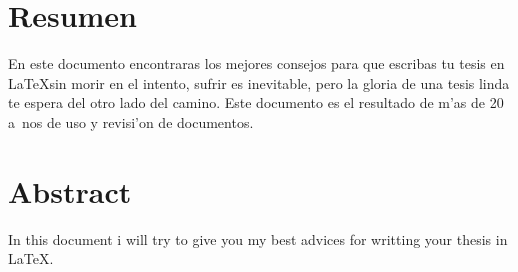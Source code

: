 

\chapter{Resumen}

En este documento encontraras los mejores consejos para que escribas
tu tesis en \LaTeX sin morir en el intento, sufrir es inevitable, pero la gloria
de una tesis linda te espera del otro lado del camino. Este documento es el resultado
 de m’as de 20 a~nos de uso y revisi’on de documentos.

\newpage
\thispagestyle{empty}

\chapter{Abstract}
 
In this document i will try to give you my best advices for writting
your thesis in \LaTeX.

\newpage
\thispagestyle{empty}

